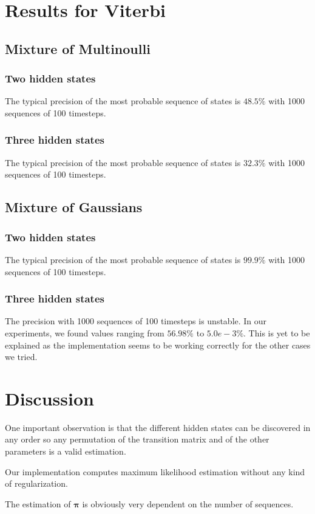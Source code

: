 \documentclass[10pt, a4paper]{article}
\begin{document}
\section{Results for Viterbi}

\subsection{Mixture of Multinoulli}
\subsubsection{Two hidden states}
The typical precision of the most probable sequence of states is $48.5\%$ with 1000 sequences of 100 timesteps.
\subsubsection{Three hidden states}
The typical precision of the most probable sequence of states is $32.3\%$ with 1000 sequences of 100 timesteps.
\subsection{Mixture of Gaussians}
\subsubsection{Two hidden states}
The typical precision of the most probable sequence of states is $99.9\%$ with 1000 sequences of 100 timesteps.
\subsubsection{Three hidden states}
The precision with 1000 sequences of 100 timesteps is unstable. In our experiments, we found values ranging from $56.98\%$ to $5.0e-3\%$. This is yet to be explained as the implementation seems to be working correctly for the other cases we tried.

\section{Discussion}
One important observation is that the different hidden states can be discovered in any order so any permutation of the transition matrix and of the other parameters is a valid estimation.

Our implementation computes maximum likelihood estimation without any kind of regularization.

The estimation of $\mathbf{\pi}$ is obviously very dependent on the number of sequences.
\end{document}
